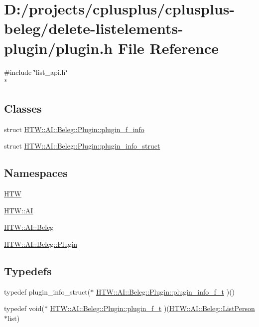 \hypertarget{delete-listelements-plugin_2plugin_8h}{\section{D\-:/projects/cplusplus/cplusplus-\/beleg/delete-\/listelements-\/plugin/plugin.h File Reference}
\label{delete-listelements-plugin_2plugin_8h}
}
{\ttfamily \#include \char`\"{}list\-\_\-api.\-h\char`\"{}}\\*
\subsection*{Classes}
\begin{DoxyCompactItemize}
\item 
struct \hyperlink{struct_h_t_w_1_1_a_i_1_1_beleg_1_1_plugin_1_1plugin__f__info}{H\-T\-W\-::\-A\-I\-::\-Beleg\-::\-Plugin\-::plugin\-\_\-f\-\_\-info}
\item 
struct \hyperlink{struct_h_t_w_1_1_a_i_1_1_beleg_1_1_plugin_1_1plugin__info__struct}{H\-T\-W\-::\-A\-I\-::\-Beleg\-::\-Plugin\-::plugin\-\_\-info\-\_\-struct}
\end{DoxyCompactItemize}
\subsection*{Namespaces}
\begin{DoxyCompactItemize}
\item 
\hyperlink{namespace_h_t_w}{H\-T\-W}
\item 
\hyperlink{namespace_h_t_w_1_1_a_i}{H\-T\-W\-::\-A\-I}
\item 
\hyperlink{namespace_h_t_w_1_1_a_i_1_1_beleg}{H\-T\-W\-::\-A\-I\-::\-Beleg}
\item 
\hyperlink{namespace_h_t_w_1_1_a_i_1_1_beleg_1_1_plugin}{H\-T\-W\-::\-A\-I\-::\-Beleg\-::\-Plugin}
\end{DoxyCompactItemize}
\subsection*{Typedefs}
\begin{DoxyCompactItemize}
\item 
typedef plugin\-\_\-info\-\_\-struct($\ast$ \hyperlink{namespace_h_t_w_1_1_a_i_1_1_beleg_1_1_plugin_a2d6055f756d6fbaacb016a64b2632b6a}{H\-T\-W\-::\-A\-I\-::\-Beleg\-::\-Plugin\-::plugin\-\_\-info\-\_\-f\-\_\-t} )()
\item 
typedef void($\ast$ \hyperlink{namespace_h_t_w_1_1_a_i_1_1_beleg_1_1_plugin_ac175157f4a126a99ff03cec00c4dd9ec}{H\-T\-W\-::\-A\-I\-::\-Beleg\-::\-Plugin\-::plugin\-\_\-f\-\_\-t} )(\hyperlink{struct_h_t_w_1_1_a_i_1_1_beleg_1_1_list_person}{H\-T\-W\-::\-A\-I\-::\-Beleg\-::\-List\-Person} $\ast$list)
\end{DoxyCompactItemize}
